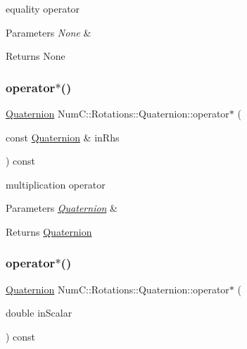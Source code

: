 equality operator


\begin{DoxyParams}{Parameters}
{\em None} & \\
\hline
\end{DoxyParams}
\begin{DoxyReturn}{Returns}
None 
\end{DoxyReturn}
\mbox{\label{class_num_c_1_1_rotations_1_1_quaternion_aba5ae0731b302ddefc426c5a9d7c7366}} 
\subsubsection{\texorpdfstring{operator$\ast$()}{operator*()}\hspace{0.1cm}{\footnotesize\ttfamily [1/3]}}
{\footnotesize\ttfamily \mbox{\hyperlink{class_num_c_1_1_rotations_1_1_quaternion}{Quaternion}} Num\+C\+::\+Rotations\+::\+Quaternion\+::operator$\ast$ (\begin{DoxyParamCaption}\item[{const \mbox{\hyperlink{class_num_c_1_1_rotations_1_1_quaternion}{Quaternion}} \&}]{in\+Rhs }\end{DoxyParamCaption}) const\hspace{0.3cm}{\ttfamily [inline]}}

multiplication operator


\begin{DoxyParams}{Parameters}
{\em \mbox{\hyperlink{class_num_c_1_1_rotations_1_1_quaternion}{Quaternion}}} & \\
\hline
\end{DoxyParams}
\begin{DoxyReturn}{Returns}
\mbox{\hyperlink{class_num_c_1_1_rotations_1_1_quaternion}{Quaternion}} 
\end{DoxyReturn}
\mbox{\label{class_num_c_1_1_rotations_1_1_quaternion_a9f3d11f98d72ce64ff4b2345c14448f0}} 
\subsubsection{\texorpdfstring{operator$\ast$()}{operator*()}\hspace{0.1cm}{\footnotesize\ttfamily [2/3]}}
{\footnotesize\ttfamily \mbox{\hyperlink{class_num_c_1_1_rotations_1_1_quaternion}{Quaternion}} Num\+C\+::\+Rotations\+::\+Quaternion\+::operator$\ast$ (\begin{DoxyParamCaption}\item[{double}]{in\+Scalar }\end{DoxyParamCaption}) const\hspace{0.3cm}{\ttfamily [inline]}}

